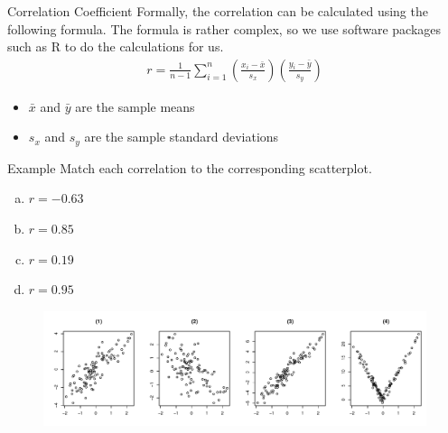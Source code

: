\documentclass[11pt, fleqn]{beamer}\usepackage[]{graphicx}\usepackage[]{color}
\begin{document}
\begin{frame}{Correlation Coefficient}
Formally, the correlation can be calculated using the following formula.  The formula is rather complex, so we use software packages such as R to do the calculations for us.\\ 

\begin{align*}
r = \frac{1}{n-1} \sum_{i=1}^n \left(\frac{x_i - \bar{x}}{s_x} \right) \left( \frac{y_i - \bar{y}}{s_y} \right)
\end{align*}
\begin{itemize}
\item $\bar{x}$ and $\bar{y}$ are the sample means
\item $s_x$ and $s_y$ are the sample standard deviations
\end{itemize}
\end{frame}

\begin{frame}{Example}
Match each correlation to the corresponding scatterplot.
\begin{enumerate}[(a)]
\item $r = -0.63$
\item $r = 0.85$
\item $r = 0.19$
\item $r = 0.95$
\end{enumerate}
\begin{figure}
\includegraphics[scale=0.4]{figure/cor_prob.pdf}
\end{figure}
\end{frame}
\end{document}
